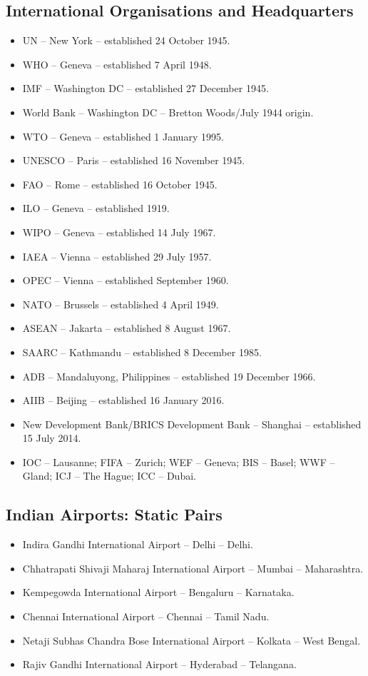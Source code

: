 \documentclass[10pt,a4paper]{article}
\begin{document}
\subsection{International Organisations and Headquarters}
\begin{itemize}
    \item UN -- New York -- established 24 October 1945.
    \item WHO -- Geneva -- established 7 April 1948.
    \item IMF -- Washington DC -- established 27 December 1945.
    \item World Bank -- Washington DC -- Bretton Woods/July 1944 origin.
    \item WTO -- Geneva -- established 1 January 1995.
    \item UNESCO -- Paris -- established 16 November 1945.
    \item FAO -- Rome -- established 16 October 1945.
    \item ILO -- Geneva -- established 1919.
    \item WIPO -- Geneva -- established 14 July 1967.
    \item IAEA -- Vienna -- established 29 July 1957.
    \item OPEC -- Vienna -- established September 1960.
    \item NATO -- Brussels -- established 4 April 1949.
    \item ASEAN -- Jakarta -- established 8 August 1967.
    \item SAARC -- Kathmandu -- established 8 December 1985.
    \item ADB -- Mandaluyong, Philippines -- established 19 December 1966.
    \item AIIB -- Beijing -- established 16 January 2016.
    \item New Development Bank/BRICS Development Bank -- Shanghai -- established 15 July 2014.
    \item IOC -- Lausanne; FIFA -- Zurich; WEF -- Geneva; BIS -- Basel; WWF -- Gland; ICJ -- The Hague; ICC -- Dubai.
\end{itemize}

\subsection{Indian Airports: Static Pairs}
\begin{itemize}
    \item Indira Gandhi International Airport -- Delhi -- Delhi.
    \item Chhatrapati Shivaji Maharaj International Airport -- Mumbai -- Maharashtra.
    \item Kempegowda International Airport -- Bengaluru -- Karnataka.
    \item Chennai International Airport -- Chennai -- Tamil Nadu.
    \item Netaji Subhas Chandra Bose International Airport -- Kolkata -- West Bengal.
    \item Rajiv Gandhi International Airport -- Hyderabad -- Telangana.
\end{itemize}
\end{document}
